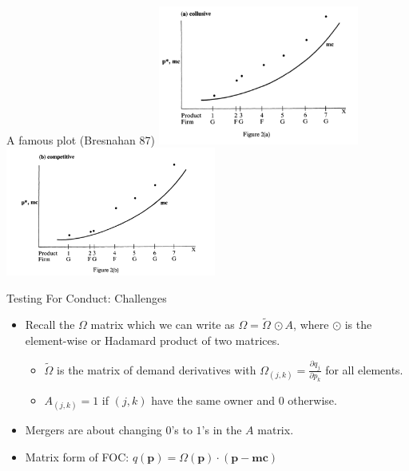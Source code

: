 \documentclass[xcolor=pdftex,dvipsnames,table,mathserif,aspectratio=169]{beamer}
\begin{document}
\begin{frame}{A famous plot (Bresnahan 87)}
\includegraphics[width = 6.6cm]{./resources/bres_plot1.png}
\includegraphics[width = 6.9cm]{./resources/bres_plot2.png}
\end{frame}



\begin{frame}{Testing For Conduct: Challenges}
\begin{itemize}
\item Recall the $\Omega$ matrix which we can write as $\Omega=\tilde{\Omega}\, \odot A$, where $\odot$ is the element-wise or Hadamard product of two matrices. 
\begin{itemize}
\item $\tilde{\Omega}$ is the matrix of demand derivatives with $\Omega_{(j,k)} = \frac{\partial q_j}{\partial p_k}$ for all elements.
\item $A_{(j,k)} =1$ if $(j,k)$ have the same owner and $0$ otherwise.
\end{itemize}
\item Mergers are about changing $0$'s to $1$'s in the $A$ matrix.
\item Matrix form of FOC: $q(\mathbf{p}) = \Omega(\mathbf{p})\cdot(\mathbf{p}-\mathbf{mc})$
\end{itemize}
\end{frame}
\end{document}
